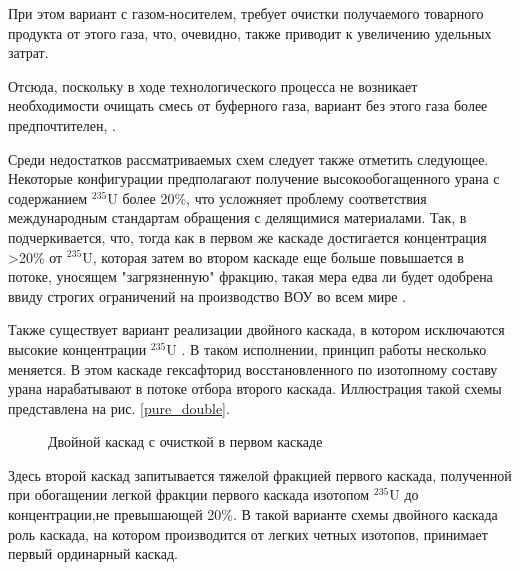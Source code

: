 При этом вариант с газом-носителем, требует очистки получаемого товарного продукта от этого газа, что, очевидно, также приводит к увеличению удельных затрат.

Отсюда, поскольку в ходе технологического процесса не возникает необходимости очищать смесь от буферного газа, вариант без этого газа более предпочтителен, \cite{smirnovKaskadnyeShemyZadachah2012}.

Среди недостатков рассматриваемых схем следует также отметить следующее.
Некоторые конфигурации предполагают получение высокообогащенного урана с содержанием $^{235}$U более 20\%, что усложняет проблему соответствия международным стандартам обращения с делящимися материалами.
Так, в \cite{palkinPurificationReprocessedUranium2016} подчеркивается, что, тогда как в первом же каскаде достигается концентрация >20\% от $^{235}$U, которая затем во втором каскаде еще больше повышается в потоке, уносящем "загрязненную" фракцию, такая мера едва ли будет одобрена ввиду строгих ограничений на производство ВОУ во всем мире \cite{ManagementHighEnriched2005}.

Также существует вариант реализации двойного каскада, в котором исключаются высокие концентрации $^{235}$U \cite{SposobIzotopnogoVosstanovleniya}.
В таком исполнении, принцип работы несколько меняется.
В этом каскаде гексафторид восстановленного по изотопному составу урана нарабатывают в потоке отбора второго каскада.
Иллюстрация такой схемы представлена на рис. \ref{pure_double}.
\begin{figure}[ht]
  \caption{Двойной каскад с очисткой в первом каскаде}\label{fig:pure_double}
\end{figure}
Здесь второй каскад запитывается тяжелой фракцией первого каскада, полученной при обогащении легкой фракции первого каскада изотопом $^{235}$U до концентрации,не превышающей 20\%.
В такой варианте схемы двойного каскада роль каскада, на котором производится от легких четных изотопов, принимает первый ординарный каскад.

